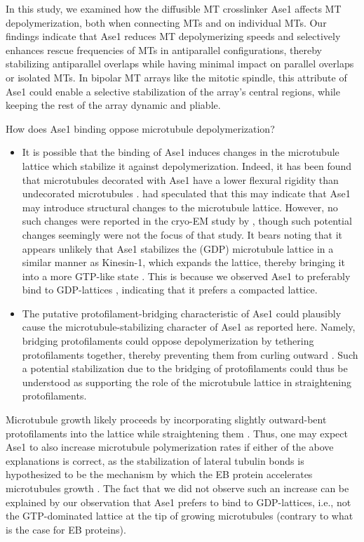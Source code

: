 In this study, we examined how the diffusible MT crosslinker Ase1 affects MT depolymerization, both when connecting MTs and on individual MTs. Our findings indicate that Ase1 reduces MT depolymerizing speeds and selectively enhances rescue frequencies of MTs in antiparallel configurations, thereby stabilizing antiparallel overlaps while having minimal impact on parallel overlaps or isolated MTs. In bipolar MT arrays like the mitotic spindle, this attribute of Ase1 could enable a selective stabilization of the array's central regions, while keeping the rest of the array dynamic and pliable.\par

How does Ase1 binding oppose microtubule depolymerization? 

\begin{itemize}
    \item It is possible that the binding of Ase1 induces changes in the microtubule lattice which stabilize it against depolymerization. Indeed, it has been found that microtubules decorated with Ase1 have a lower flexural rigidity than undecorated microtubules \parencite{Portran2013}. \cite{Portran2013} had speculated that this may indicate that Ase1 may introduce structural changes to the microtubule lattice. However, no such changes were reported in the cryo-EM study by \cite{Kellogg2016}, though such potential changes seemingly were not the focus of that study. It bears noting that it appears unlikely that Ase1 stabilizes the (GDP) microtubule lattice in a similar manner as Kinesin-1, which expands the lattice, thereby bringing it into a more GTP-like state \parencite{Peet2018}. This is because we observed Ase1 to preferably bind to GDP-lattices , indicating that it prefers a compacted lattice.
    \item The putative protofilament-bridging characteristic of Ase1  could plausibly cause the microtubule-stabilizing character of Ase1 as reported here. Namely, bridging protofilaments could oppose depolymerization by tethering protofilaments together, thereby preventing them from curling outward . Such a potential stabilization due to the bridging of protofilaments could thus be understood as supporting the role of the microtubule lattice in straightening protofilaments.
\end{itemize}
Microtubule growth likely proceeds by incorporating slightly outward-bent protofilaments into the lattice while straightening them . Thus, one may expect Ase1 to also increase microtubule polymerization rates if either of the above explanations is correct, as the stabilization of lateral tubulin bonds is hypothesized to be the mechanism by which the EB protein accelerates microtubules growth . The fact that we did not observe such an increase can be explained by our observation that Ase1 prefers to bind to GDP-lattices, i.e., not the GTP-dominated lattice at the tip of growing microtubules (contrary to what is the case for EB proteins).

